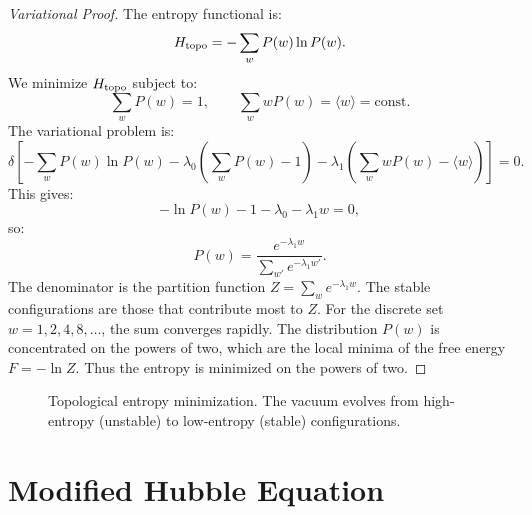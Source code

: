 \documentclass[12pt,oneside]{book}
\begin{document}
\begin{proof}[Variational Proof]
The entropy functional is:
\[
H_{\rm topo} = -\sum_{w} P(w) \ln P(w).
\]
We minimize $H_{\rm topo}$ subject to:
\[
\sum_w P(w) = 1, \qquad \sum_w w P(w) = \langle w \rangle = \text{const}.
\]
The variational problem is:
\[
\delta\left[-\sum_w P(w)\ln P(w) - \lambda_0\left(\sum_w P(w) - 1\right) - \lambda_1\left(\sum_w w P(w) - \langle w\rangle\right)\right] = 0.
\]
This gives:
\[
-\ln P(w) - 1 - \lambda_0 - \lambda_1 w = 0,
\]
so:
\[
P(w) = \frac{e^{-\lambda_1 w}}{\sum_{w'} e^{-\lambda_1 w'}}.
\]
The denominator is the partition function $Z = \sum_w e^{-\lambda_1 w}$. The stable configurations are those that contribute most to $Z$. For the discrete set $w = 1,2,4,8,\ldots$, the sum converges rapidly. The distribution $P(w)$ is concentrated on the powers of two, which are the local minima of the free energy $F = -\ln Z$. Thus the entropy is minimized on the powers of two.
\end{proof}

\begin{figure}[H]
\centering
{}
\caption{Topological entropy minimization. The vacuum evolves from high-entropy (unstable) to low-entropy (stable) configurations.}
\label{fig:temp}
\end{figure}

\section{Modified Hubble Equation}
\end{document}
